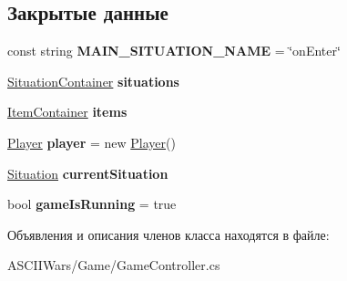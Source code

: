 \subsection*{Закрытые данные}
\begin{DoxyCompactItemize}
\item 
\hypertarget{class_a_s_c_i_i_wars_1_1_game_1_1_game_controller_a14c3ad1eaf01d8c03789d8cc1fd09dde}{}\label{class_a_s_c_i_i_wars_1_1_game_1_1_game_controller_a14c3ad1eaf01d8c03789d8cc1fd09dde} 
const string {\bfseries M\+A\+I\+N\+\_\+\+S\+I\+T\+U\+A\+T\+I\+O\+N\+\_\+\+N\+A\+ME} = \char`\"{}on\+Enter\char`\"{}
\item 
\hypertarget{class_a_s_c_i_i_wars_1_1_game_1_1_game_controller_aaab40310e11bd03711896ec5685ebe10}{}\label{class_a_s_c_i_i_wars_1_1_game_1_1_game_controller_aaab40310e11bd03711896ec5685ebe10} 
\hyperlink{class_a_s_c_i_i_wars_1_1_game_1_1_situation_container}{Situation\+Container} {\bfseries situations}
\item 
\hypertarget{class_a_s_c_i_i_wars_1_1_game_1_1_game_controller_a96ab06ced4cf725ad1a4200425a533eb}{}\label{class_a_s_c_i_i_wars_1_1_game_1_1_game_controller_a96ab06ced4cf725ad1a4200425a533eb} 
\hyperlink{class_a_s_c_i_i_wars_1_1_game_1_1_item_container}{Item\+Container} {\bfseries items}
\item 
\hypertarget{class_a_s_c_i_i_wars_1_1_game_1_1_game_controller_a16a24596b98a17361e430d984f85a7ca}{}\label{class_a_s_c_i_i_wars_1_1_game_1_1_game_controller_a16a24596b98a17361e430d984f85a7ca} 
\hyperlink{class_a_s_c_i_i_wars_1_1_game_1_1_player}{Player} {\bfseries player} = new \hyperlink{class_a_s_c_i_i_wars_1_1_game_1_1_player}{Player}()
\item 
\hypertarget{class_a_s_c_i_i_wars_1_1_game_1_1_game_controller_ac62620afe49df42fd9f835da53e11a8b}{}\label{class_a_s_c_i_i_wars_1_1_game_1_1_game_controller_ac62620afe49df42fd9f835da53e11a8b} 
\hyperlink{class_a_s_c_i_i_wars_1_1_game_1_1_situation}{Situation} {\bfseries current\+Situation}
\item 
\hypertarget{class_a_s_c_i_i_wars_1_1_game_1_1_game_controller_ae22654db8de3ef6d8278931acaa9c486}{}\label{class_a_s_c_i_i_wars_1_1_game_1_1_game_controller_ae22654db8de3ef6d8278931acaa9c486} 
bool {\bfseries game\+Is\+Running} = true
\end{DoxyCompactItemize}


Объявления и описания членов класса находятся в файле\+:\begin{DoxyCompactItemize}
\item 
A\+S\+C\+I\+I\+Wars/\+Game/Game\+Controller.\+cs\end{DoxyCompactItemize}
